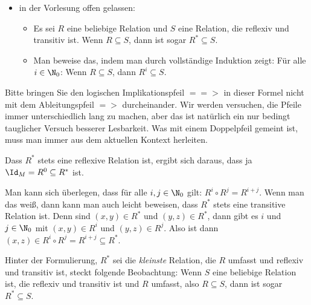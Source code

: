 \begin{tutorium}
\begin{itemize}
\begin{itemize}
    \end{itemize}
  \item \zB in der Vorlesung offen gelassen: 
    \begin{itemize}
    \item Es sei $R$ eine beliebige Relation und $S$ eine Relation, die
      reflexiv und transitiv ist. Wenn $R\subseteq S$, dann ist sogar
      $R^* \subseteq S$.
    \item Man beweise das, indem man durch vollständige Induktion zeigt:
      Für alle $i\in \N_0$: Wenn $R\subseteq S$, dann $R^i\subseteq S$.
    \end{itemize}
  \end{itemize}
\end{tutorium}

Bitte bringen Sie den logischen Implikationspfeil $==>$ in dieser
Formel nicht mit dem Ableitungspfeil $=>$ durcheinander.  Wir werden
versuchen, die Pfeile immer unterschiedlich lang zu machen, aber das
ist natürlich ein nur bedingt tauglicher Versuch besserer Lesbarkeit.
Was mit einem Doppelpfeil gemeint ist, muss man immer aus dem
aktuellen Kontext herleiten.

Dass $R^*$ stets eine reflexive Relation ist, ergibt sich daraus, dass
ja $\Id_M=R^0 \subseteq R^*$ ist.

Man kann sich überlegen, dass für alle $i,j\in\N_0$ gilt: $R^i \circ
R^j = R^{i+j}$.  Wenn man das weiß, dann kann man auch leicht
beweisen, dass $R^*$ stets eine transitive Relation ist. Denn sind
$(x,y)\in R^*$ und $(y,z)\in R^*$, dann gibt es $i$ und $j\in \N_0$
mit $(x,y)\in R^i$ und $(y,z)\in R^j$. Also ist dann $(x,z)\in
R^i\circ R^j = R^{i+j} \subseteq R^*$.

Hinter der Formulierung, $R^*$ sei die \emph{kleinste} Relation, die
$R$ umfasst und reflexiv und transitiv ist, steckt folgende
Beobachtung: Wenn $S$ eine beliebige Relation ist, die reflexiv und
transitiv ist und $R$ umfasst, also $R\subseteq S$, dann ist sogar
$R^*\subseteq S$. 

